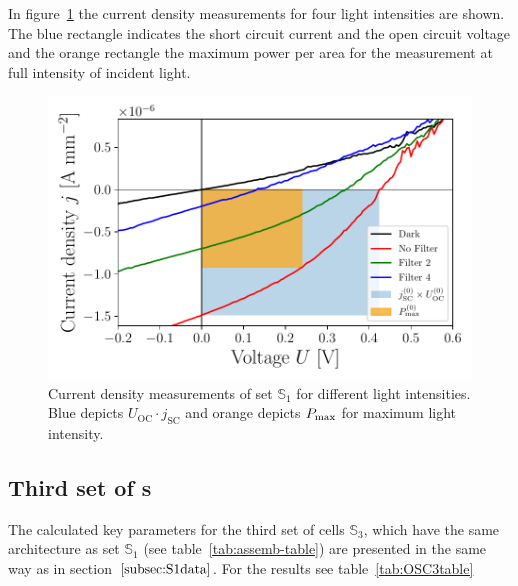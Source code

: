 \documentclass[a4paper,10pt,twocolumn]{article}
\begin{document}
\begin{extract*}
In figure~\ref{fig:OSC1Graph} the current density measurements for four light intensities are shown. The blue rectangle indicates the short circuit current and the open circuit voltage and the orange rectangle the maximum power per area for the measurement at full intensity of incident light.

\begin{figure}[ht]\centering
	\includegraphics[width=\columnwidth]{../../../IV-Curve-Analysis/OSC1Graph.pdf}
	\caption{Current density measurements of set $\mathbb{S}_1$ for different light intensities. Blue depicts $U_{\mathrm{OC}}\!\cdot\!j_{\mathrm{SC}}$ and orange depicts $P_{\text{max}}$ for maximum light intensity.}
	\label{fig:OSC1Graph}
\end{figure}

\subsection{Third set of \BHSC s}

The calculated key parameters for the third set of cells $\mathbb{S}_3$, which have the same architecture as set $\mathbb{S}_1$ (see table~\ref{tab:assemb-table}) are presented in the same way as in section~$\ref{subsec:S1data}$. For the results see table~\ref{tab:OSC3table}


\end{extract*}
\end{document}

